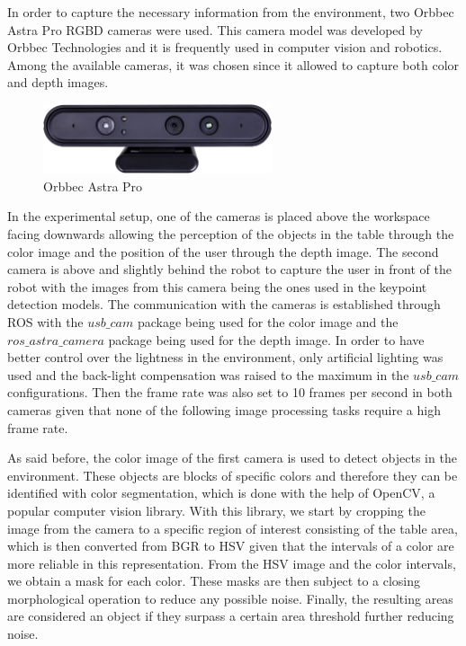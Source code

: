 
In order to capture the necessary information from the environment, two Orbbec Astra Pro RGBD cameras were used. This camera model was developed by Orbbec Technologies and it is frequently used in computer vision and robotics\cite{AstraPro}. Among the available cameras, it was chosen since it allowed to capture both color and depth images.

\begin{figure}[!ht]
\centerline{\includegraphics[width=0.6\textwidth]{figs/Astra.jpg}}
\caption[Orbbec Astra Pro]{Orbbec Astra Pro \cite{AstraPro}}
\label{fig:orbbec_astra_pro}
\end{figure}

In the experimental setup, one of the cameras is placed above the workspace facing downwards allowing the perception of the objects in the table through the color image and the position of the user through the depth image. The second camera is above and slightly behind the robot to capture the user in front of the robot with the images from this camera being the ones used in the keypoint detection models. The communication with the cameras is established through ROS with the $usb\_cam$ package being used for the color image and the $ros\_astra\_camera$ package being used for the depth image. In order to have better control over the lightness in the environment, only artificial lighting was used and the back-light compensation was raised to the maximum in the $usb\_cam$ configurations. Then the frame rate was also set to 10 frames per second in both cameras given that none of the following image processing tasks require a high frame rate.

As said before, the color image of the first camera is used to detect objects in the environment. These objects are blocks of specific colors and therefore they can be identified with color segmentation, which is done with the help of OpenCV, a popular computer vision library. With this library, we start by cropping the image from the camera to a specific region of interest consisting of the table area, which is then converted from BGR to HSV given that the intervals of a color are more reliable in this representation. From the HSV image and the color intervals, we obtain a mask for each color. These masks are then subject to a closing morphological operation to reduce any possible noise. Finally, the resulting areas are considered an object if they surpass a certain area threshold further reducing noise.

